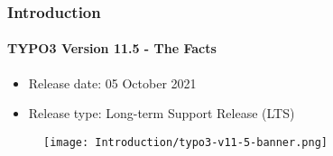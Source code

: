 %

\begin{frame}[fragile]
	\frametitle{Introduction}
	\framesubtitle{TYPO3 Version 11.5 - The Facts}

	\begin{itemize}
		\item Release date: 05 October 2021
		\item Release type: Long-term Support Release (LTS)
	\end{itemize}

	\begin{figure}
		\texttt{[image: Introduction/typo3-v11-5-banner.png]}
	\end{figure}

\end{frame}

